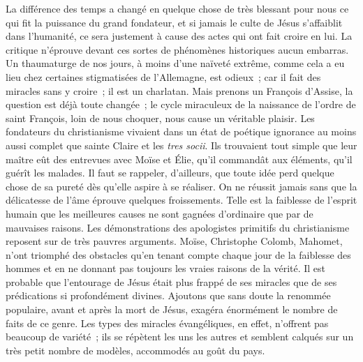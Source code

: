 \documentclass[french,twoside]{book} %
\begin{document}
La différence des temps a changé en quelque chose de très blessant pour nous ce qui fit la puissance du grand fondateur, et si jamais le culte de Jésus s’affaiblit dans l’humanité, ce sera justement à cause des actes qui ont fait croire en lui. La critique n’éprouve devant ces sortes de phénomènes historiques aucun embarras. Un thaumaturge de nos jours, à moins d’une naïveté extrême, comme cela a eu lieu chez certaines stigmatisées de l’Allemagne, est odieux ; car il fait des miracles sans y croire ; il est un charlatan. Mais prenons un François d’Assise, la question est déjà toute changée ; le cycle miraculeux de la naissance de l’ordre de saint François, loin de nous choquer, nous cause un véritable plaisir. Les fondateurs du christianisme vivaient dans un état de poétique ignorance au moins aussi complet que sainte Claire et les {\itshape tres socii}. Ils trouvaient tout simple que leur maître eût des entrevues avec Moïse et Élie, qu’il commandât aux éléments, qu’il guérît les malades. Il faut se rappeler, d’ailleurs, que toute idée perd quelque chose de sa pureté dès qu’elle aspire à se réaliser. On ne réussit jamais sans que la délicatesse de l’âme éprouve quelques froissements. Telle est la faiblesse de l’esprit humain que les meilleures causes ne sont gagnées d’ordinaire que par de mauvaises raisons. Les démonstrations des apologistes primitifs du christianisme reposent sur de très pauvres arguments. Moïse, Christophe Colomb, Mahomet, n’ont triomphé des obstacles qu’en tenant compte chaque jour de la faiblesse des hommes et en ne donnant pas toujours les vraies raisons de la vérité. Il est probable que l’entourage de Jésus était plus frappé de ses miracles que de ses prédications si profondément divines. Ajoutons que sans doute la renommée populaire, avant et après la mort de Jésus, exagéra énormément le nombre de faits de ce genre. Les types des miracles évangéliques, en effet, n’offrent pas beaucoup de variété ; ils se répètent les uns les autres et semblent calqués sur un très petit nombre de modèles, accommodés au goût du pays.\par
\end{document}
